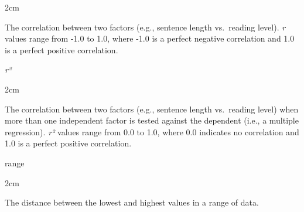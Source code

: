 \documentclass[
]{book}
\newenvironment{glsentry}
  {
  \begin{minipage}{\textwidth}
  }
  {
  \end{minipage}
  }
\newenvironment{glsterm}
  {
  \bfseries
  }
  {
  }
\newenvironment{glsdef}
  {
  \noindent
  \flushleft
  \begin{adjustwidth}{2cm}{}
  }
  {
  \end{adjustwidth}
  }
\theoremstyle{definition}
\theoremstyle{definition}
\theoremstyle{definition}
\theoremstyle{definition}
\theoremstyle{remark}
\begin{document}
\begin{glsdef}
The correlation between two factors (e.g., sentence length vs.~reading level). \emph{r} values range from -1.0 to 1.0, where -1.0 is a perfect negative correlation and 1.0 is a perfect positive correlation.

\end{glsdef}

\begin{glsentry}

\begin{glsterm}
\emph{r²}

\end{glsterm}

\begin{glsdef}
The correlation between two factors (e.g., sentence length vs.~reading level) when more than one independent factor is tested against the dependent (i.e., a multiple regression). \emph{r²} values range from 0.0 to 1.0, where 0.0 indicates no correlation and 1.0 is a perfect positive correlation.

\end{glsdef}

\end{glsentry}

\begin{glsentry}

\begin{glsterm}
range

\end{glsterm}

\begin{glsdef}
The distance between the lowest and highest values in a range of data.

\end{glsdef}

\end{glsentry}
\end{document}
